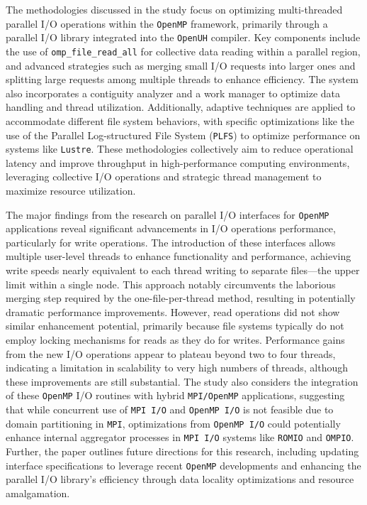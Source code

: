 The methodologies discussed in the study focus on optimizing multi-threaded parallel I/O operations within the \texttt{OpenMP} framework, primarily through a parallel I/O library integrated into the \texttt{OpenUH} compiler. Key components include the use of \texttt{omp\_file\_read\_all} for collective data reading within a parallel region, and advanced strategies such as merging small I/O requests into larger ones and splitting large requests among multiple threads to enhance efficiency. The system also incorporates a contiguity analyzer and a work manager to optimize data handling and thread utilization. Additionally, adaptive techniques are applied to accommodate different file system behaviors, with specific optimizations like the use of the Parallel Log-structured File System (\texttt{PLFS}) to optimize performance on systems like \texttt{Lustre}. These methodologies collectively aim to reduce operational latency and improve throughput in high-performance computing environments, leveraging collective I/O operations and strategic thread management to maximize resource utilization.

The major findings from the research on parallel I/O interfaces for \texttt{OpenMP} applications reveal significant advancements in I/O operations performance, particularly for write operations. The introduction of these interfaces allows multiple user-level threads to enhance functionality and performance, achieving write speeds nearly equivalent to each thread writing to separate files—the upper limit within a single node. This approach notably circumvents the laborious merging step required by the one-file-per-thread method, resulting in potentially dramatic performance improvements. However, read operations did not show similar enhancement potential, primarily because file systems typically do not employ locking mechanisms for reads as they do for writes. Performance gains from the new I/O operations appear to plateau beyond two to four threads, indicating a limitation in scalability to very high numbers of threads, although these improvements are still substantial. The study also considers the integration of these \texttt{OpenMP} I/O routines with hybrid \texttt{MPI/OpenMP} applications, suggesting that while concurrent use of \texttt{MPI I/O} and \texttt{OpenMP I/O} is not feasible due to domain partitioning in \texttt{MPI}, optimizations from \texttt{OpenMP I/O} could potentially enhance internal aggregator processes in \texttt{MPI I/O} systems like \texttt{ROMIO} and \texttt{OMPIO}. Further, the paper outlines future directions for this research, including updating interface specifications to leverage recent \texttt{OpenMP} developments and enhancing the parallel I/O library's efficiency through data locality optimizations and resource amalgamation.

